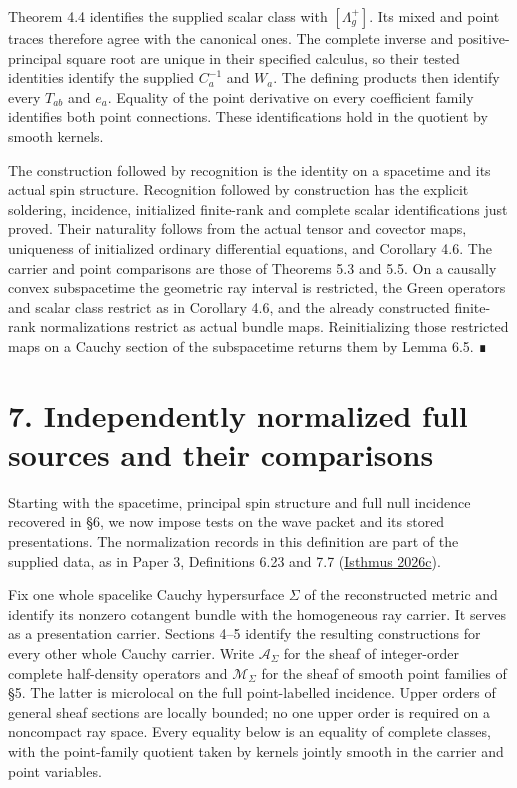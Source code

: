 \documentclass[
  english,
  11pt,
  reqno]{amsart}
\begin{document}
Theorem 4.4 identifies the supplied scalar class with \([\Lambda_g^+]\).
Its mixed and point traces therefore agree with the canonical ones. The
complete inverse and positive-principal square root are unique in their
specified calculus, so their tested identities identify the supplied
\(C_a^{-1}\) and \(W_a\). The defining products then identify every
\(T_{ab}\) and \(e_a\). Equality of the point derivative on every
coefficient family identifies both point connections. These
identifications hold in the quotient by smooth kernels.

The construction followed by recognition is the identity on a spacetime
and its actual spin structure. Recognition followed by construction has
the explicit soldering, incidence, initialized finite-rank and complete
scalar identifications just proved. Their naturality follows from the
actual tensor and covector maps, uniqueness of initialized ordinary
differential equations, and Corollary 4.6. The carrier and point
comparisons are those of Theorems 5.3 and 5.5. On a causally convex
subspacetime the geometric ray interval is restricted, the Green
operators and scalar class restrict as in Corollary 4.6, and the already
constructed finite-rank normalizations restrict as actual bundle maps.
Reinitializing those restricted maps on a Cauchy section of the
subspacetime returns them by Lemma 6.5. ∎

\protect{}\label{sec:global-normalized-full-sources}

\section{7. Independently normalized full sources and their
comparisons}\label{independently-normalized-full-sources-and-their-comparisons}

Starting with the spacetime, principal spin structure and full null
incidence recovered in §6, we now impose tests on the wave packet and
its stored presentations. The normalization records in this definition
are part of the supplied data, as in Paper 3, Definitions 6.23 and 7.7
(\hyperref[ref-IsthmusSmooth2026]{Isthmus 2026c}).

Fix one whole spacelike Cauchy hypersurface \(\Sigma\) of the
reconstructed metric and identify its nonzero cotangent bundle with the
homogeneous ray carrier. It serves as a presentation carrier. Sections
4--5 identify the resulting constructions for every other whole Cauchy
carrier. Write \(\mathcal A_\Sigma\) for the sheaf of integer-order
complete half-density operators and \(\mathcal M_\Sigma\) for the sheaf
of smooth point families of §5. The latter is microlocal on the full
point-labelled incidence. Upper orders of general sheaf sections are
locally bounded; no one upper order is required on a noncompact ray
space. Every equality below is an equality of complete classes, with the
point-family quotient taken by kernels jointly smooth in the carrier and
point variables.
\end{document}
